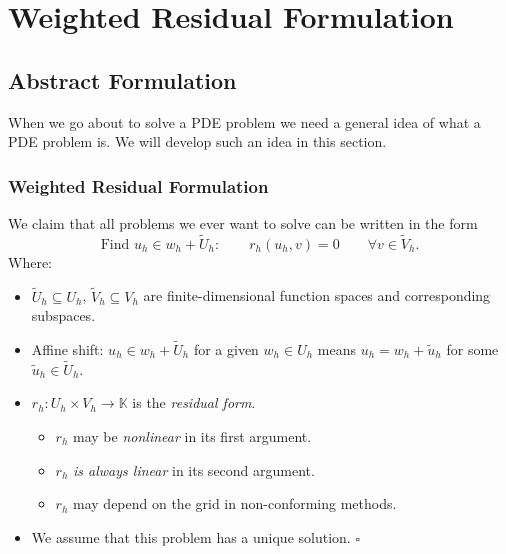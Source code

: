 \section{Weighted Residual Formulation}

\subsection{Abstract Formulation}

When we go about to solve a PDE problem we need a general idea of what
a PDE problem is. We will develop such an idea in this section.

\begin{frame}
\frametitle<presentation>{Weighted Residual Formulation}
\begin{Def}
We claim that all problems we ever want to solve can be written in the form
\begin{equation}
\text{Find } u_h\in w_h + \tilde{U}_h : \qquad r_h(u_h,v) =
0 \qquad \forall v\in \tilde{V}_h.  
\end{equation}
Where:
\begin{itemize}
\item $\tilde{U}_h\subseteq U_h$, $\tilde{V}_h\subseteq V_h$ are
finite-dimensional function spaces and corresponding subspaces.
\item Affine shift: $u_h\in w_h + \tilde{U}_h$ for a given $w_h\in U_h$ means
$u_h = w_h + \tilde{u}_h$ for some $\tilde{u}_h\in\tilde{U}_h$.
\item $r_h : U_h \times V_h \to \mathbb{K}$ is the \textit{residual form}.
\begin{itemize}
\item $r_h$ may be \textit{nonlinear} in its first argument.
\item $r_h$ \textit{is always linear} in its second argument.
\item $r_h$ may depend on the grid in non-conforming methods.
\end{itemize}
\item We assume that this problem has a unique solution. \hfill$\square$
\end{itemize}
\end{Def}
\end{frame}

